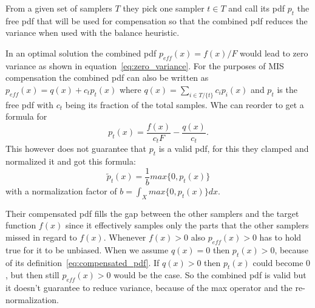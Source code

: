 From a given set of samplers $ T $ they pick one sampler $ t \in T $ and call its pdf $ p_t $ the free pdf that will be used for compensation
so that the combined pdf reduces the variance when used with the balance heuristic.

In an optimal solution the combined pdf $ p_{eff}(x) = f(x)/F $ would lead to zero variance as shown in equation~\ref{eq:zero_variance}.
For the purposes of MIS compensation the combined pdf can also be written as $ p_{eff}(x) = q(x) + c_t p_t(x) $ where $ q(x) = \sum_{i \in T/\{t\}} c_i p_i(x) $
and $ p_t $ is the free pdf with $ c_t $ being its fraction of the total samples.
Whe can reorder to get a formula for
\begin{equation}
    \label{eq:compensated_pdf}
    p_t(x) = \frac{f(x)}{c_t F} - \frac{q(x)}{c_t}.
\end{equation}
This however does not guarantee that $ p_t $ is a valid pdf,
for this they clamped and normalized it and got this formula:
\begin{equation}
    \label{eq:valid_compensated_pdf}
    \tilde{p}_t(x) = \frac{1}{b} max\{0, p_t(x)\}
\end{equation}
with a normalization factor of $ b = \int_X max\{0, p_t(x)\} dx $.

Their compensated pdf fills the gap between the other samplers and the target function $ f(x) $
since it effectively samples only the parts that the other samplers missed in regard to $ f(x) $.
Whenever $ f(x) > 0 $ also $ p_{eff}(x) > 0 $ has to hold true for it to be unbiased.
When we assume $ q(x) = 0 $ then $ p_t(x) > 0 $, because of its definition~\ref{eq:compensated_pdf}.
If $ q(x) > 0 $ then $ p_t(x) $ could become $ 0 $, but then still $ p_{eff}(x) > 0 $ would be the case.
So the combined pdf is valid but it doesn't guarantee to reduce variance, because of the max operator and the re-normalization.


